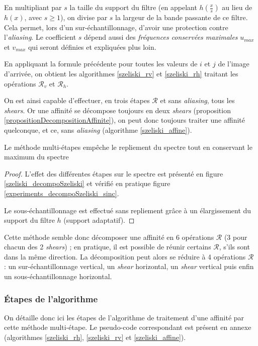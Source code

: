 	En multipliant par $s$ la taille du support du filtre (en appelant $h(\frac{x}{s})$ au lieu de $h(x)$, avec $s\geq 1$), on divise par $s$ la largeur de la bande passante de ce filtre. Cela permet, lors d'un sur-échantillonnage, d'avoir une protection contre l'\emph{aliasing}. Le coefficient $s$ dépend aussi des \emph{fréquences conservées maximales} $u_{max}$ et $v_{max}$ qui seront définies et expliquées plus loin.
	
	En appliquant la formule précédente pour toutes les valeurs de $i$ et $j$ de l'image d'arrivée, on obtient les algorithmes \ref{szeliski_rv} et \ref{szeliski_rh} traitant les opérations $\mathcal R_v$ et $\mathcal R_h$. \label{szeliski_rv_rh_section}
	
	On est ainsi capable d'effectuer, en trois étapes $\mathcal R$ et sans \emph{aliasing}, tous les \emph{shears}. Or une affinité se décompose toujours en deux \emph{shears} (proposition \ref{propositionDecompositionAffinite}), on peut donc toujours traiter une affinité quelconque, et ce, sans \emph{aliasing} (algorithme \ref{szeliski_affine}).

	\begin{thm}
	Le méthode multi-étapes \cite{szeliski2010high} empêche le repliement du spectre tout en conservant le maximum du spectre
	\end{thm}
	\begin{proof}
	L'effet des différentes étapes sur le spectre est présenté en figure \ref{szeliski_decompoSzeliski} et vérifié en pratique figure \ref{experiments_decompoSzeliski_sinc}.
	
	Le sous-échantillonnage est effectué sans repliement grâce à un élargissement du support du filtre $h$ (support adaptatif).
	\end{proof}
	
	Cette méthode semble donc décomposer une affinité en 6 opérations $\mathcal R$ (3 pour chacun des 2 \emph{shears}) ; en pratique, il est possible de réunir certains $\mathcal R$, s'ils sont dans la même direction. La décomposition peut alors se réduire à 4 opérations $\mathcal R$ : un sur-échantillonnage vertical, un \emph{shear} horizontal, un \emph{shear} vertical puis enfin un sous-échantillonnage horizontal.
	
\subsubsection{Étapes de l'algorithme}
	\label{szeliski_affine_section}
	On détaille donc ici les étapes de l'algorithme de traitement d'une affinité par cette méthode multi-étape. Le pseudo-code correspondant est présent en annexe (algorithmes \ref{szeliski_rh}, \ref{szeliski_rv} et \ref{szeliski_affine}).
	
